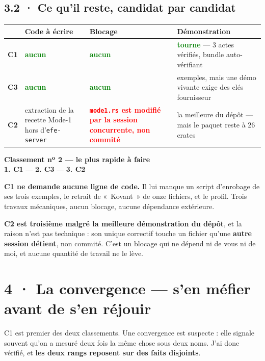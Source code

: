 \documentclass[10pt]{article}
\newcommand{\best}[1]{\textcolor{green}{\textbf{#1}}}
\newcommand{\pire}[1]{\textcolor{red}{\textbf{#1}}}
\newcommand{\code}[1]{\texttt{\small #1}}
\begin{document}
\subsection{3.2 · Ce qu'il reste, candidat par candidat}

\renewcommand{\arraystretch}{1.25}
\begin{center}\small
\begin{tabular}{@{}c >{\raggedright\arraybackslash}p{4.4cm} >{\raggedright\arraybackslash}p{4.6cm} >{\raggedright\arraybackslash}p{5.2cm}@{}}
\toprule
& \textbf{Code à écrire} & \textbf{Blocage} & \textbf{Démonstration} \\
\midrule
\textbf{C1} & \best{aucun} & \best{aucun} & \best{tourne} --- 3 actes vérifiés, bundle auto-vérifiant \\
\textbf{C3} & \best{aucun} & \best{aucun} & 17 exemples, mais une démo vivante exige des clés fournisseur \\
\textbf{C2} & extraction de la recette Mode-1 hors d'\code{efe-server} & \pire{\code{mode1.rs} est modifié par la session concurrente, non commité} & la meilleure du dépôt --- mais le paquet reste à 26 crates \\
\bottomrule
\end{tabular}
\end{center}

\begin{podium}
\textbf{Classement nº 2 --- le plus rapide à faire} \\[3pt]
\textbf{1. C1} \quad --- \quad \textbf{2. C3} \quad --- \quad \textbf{3. C2}
\end{podium}

\textbf{C1 ne demande aucune ligne de code.} Il lui manque un script d'enrobage de ses trois exemples,
le retrait de \mbox{« Kovant »} de onze fichiers, et le profil. Trois travaux mécaniques, aucun blocage,
aucune dépendance extérieure.

\textbf{C2 est troisième malgré la meilleure démonstration du dépôt}, et la raison n'est pas technique :
son unique correctif touche un fichier qu'une \textbf{autre session détient}, non commité. C'est un
blocage qui ne dépend ni de vous ni de moi, et aucune quantité de travail ne le lève.

\section{4 · La convergence --- s'en méfier avant de s'en réjouir}

C1 est premier des deux classements. Une convergence est suspecte : elle signale souvent qu'on a mesuré
deux fois la même chose sous deux noms. J'ai donc vérifié, et \textbf{les deux rangs reposent sur des
faits disjoints}.
\end{document}
